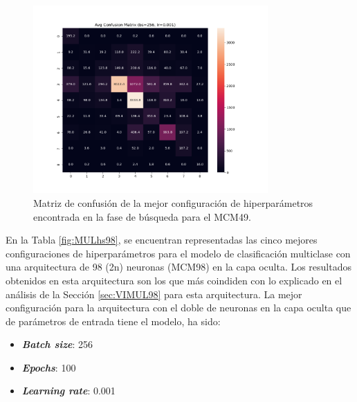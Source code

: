 \begin{figure}[H]
    \centering
    \includegraphics[width=0.8\textwidth]{./img/modelo/matrices_confusion/MC_ENT_MCM49.png}
    \caption{Matriz de confusión de la mejor configuración de hiperparámetros encontrada en la fase de búsqueda para el MCM49.}
    \label{fig:MC_ENT_MCM49}
\end{figure}



En la Tabla \ref{fig:MULhs98}, se encuentran representadas las cinco mejores configuraciones de hiperparámetros para el modelo de clasificación multiclase con una arquitectura de 98 (2n) neuronas (MCM98) en la capa oculta. Los resultados obtenidos en esta arquitectura son los que más coindiden con lo explicado en el análisis de la Sección \ref{sec:VIMUL98} para esta arquitectura. La mejor configuración para la arquitectura con el doble de neuronas en la capa oculta que de parámetros de entrada tiene el modelo, ha sido:
\begin{itemize}
	\item \textbf{\textit{Batch size}}: 256
	\item \textbf{\textit{Epochs}}: 100
	\item \textbf{\textit{Learning rate}}: 0.001
\end{itemize}

